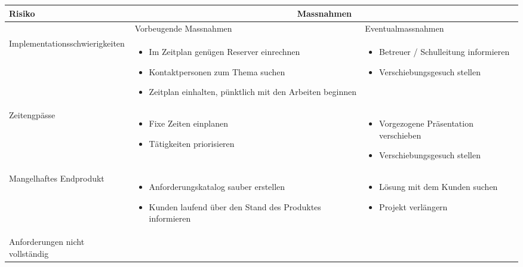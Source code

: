 \begin{table}[ht]
\centering
  \begin{tabular}{  l | p{4cm} | p{4cm} }
	\hline
	\rowcolor{darkgray}
	\textbf{Risiko}					&	\multicolumn{2}{|c|}{\textbf{Massnahmen}} \\ \hline
	\rowcolor{gray}
								&	Vorbeugende Massnahmen & Eventualmassnahmen	\\ \hline
	Implementationsschwierigkeiten
								&	\begin{itemize}
										\item Im Zeitplan genügen Reserver einrechnen
										\item Kontaktpersonen zum Thema suchen
										\item Zeitplan einhalten, pünktlich mit den Arbeiten beginnen
									\end{itemize}
								&	\begin{itemize}
										\item Betreuer / Schulleitung informieren
										\item Verschiebungsgesuch stellen
									\end{itemize}						\\ \hline
	Zeitengpässe
								&	\begin{itemize}
										\item Fixe Zeiten einplanen
										\item Tätigkeiten priorisieren
									\end{itemize}
								&	\begin{itemize}
										\item Vorgezogene Präsentation verschieben
										\item Verschiebungsgesuch stellen
									\end{itemize}	\\ \hline
	Mangelhaftes Endprodukt		
								&	\begin{itemize}
										\item Anforderungskatalog sauber erstellen
										\item Kunden laufend über den Stand des Produktes informieren
									\end{itemize}
								&	\begin{itemize}
										\item Lösung mit dem Kunden suchen
										\item Projekt verlängern
									\end{itemize}	\\ \hline	
	Anforderungen nicht vollständig	

\end{tabular}
\end{table}
